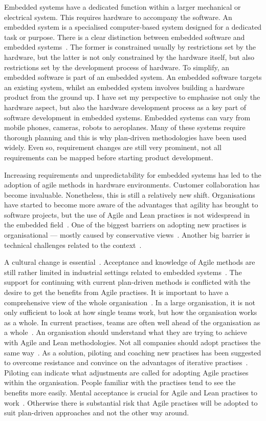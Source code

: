 \documentclass[english]{tktltiki2}
\begin{document}
Embedded systems have a dedicated function within a larger mechanical or electrical system. This requires hardware to accompany the software. An embedded system is a specialised computer-based system designed for a dedicated task or purpose. There is a clear distinction between embedded software and embedded systems~\cite{KRM13}. The former is constrained usually by restrictions set by the hardware, but the latter is not only constrained by the hardware itself, but also restrictions set by the development process of hardware. To simplify, an embedded software is part of an embedded system. An embedded software targets an existing system, whilst an embedded system involves building a hardware product from the ground up. I have set my perspective to emphasise not only the hardware aspect, but also the hardware development process as a key part of software development in embedded systems. Embedded systems can vary from mobile phones, cameras, robots to aeroplanes. Many of these systems require thorough planning and this is why plan-driven methodologies have been used widely. Even so, requirement changes are still very prominent, not all requirements can be mapped before starting product development.

Increasing requirements and unpredictability for embedded systems has led to the adoption of agile methods in hardware environments. Customer collaboration has become invaluable. Nonetheless, this is still a relatively new shift. Organisations have started to become more aware of the advantages that agility has brought to software projects, but the use of Agile and Lean practises is not widespread in the embedded field~\cite{CWR10, EB12, KRM13}. One of the biggest barriers on adopting new practises is organisational — mostly caused by conservative views~\cite{Pop02, HAB12}. Another big barrier is technical challenges related to the context~\cite{KRM13}.

A cultural change is essential~\cite{HAB12, KRM13}. Acceptance and knowledge of Agile methods are still rather limited in industrial settings related to embedded systems~\cite{HMP12}. The support for continuing with current plan-driven methods is conflicted with the desire to get the benefits from Agile practises. It is important to have a comprehensive view of the whole organisation~\cite{KRM13}. In a large organisation, it is not only sufficient to look at how single teams work, but how the organisation works as a whole. In current practises, teams are often well ahead of the organisation as a whole~\cite{HAB12}. An organisation should understand what they are trying to achieve with Agile and Lean methodologies. Not all companies should adopt practises the same way~\cite{KRM13}. As a solution, piloting and coaching new practises has been suggested to overcome resistance and convince on the advantages of iterative practises~\cite{CWR10, EB12, HMP12, KRM13}. Piloting can indicate what adjustments are called for adopting Agile practises within the organisation. People familiar with the practises tend to see the benefits more easily. Mental acceptance is crucial for Agile and Lean practises to work~\cite{HMP12}. Otherwise there is substantial risk that Agile practises will be adopted to suit plan-driven approaches and not the other way around.
\end{document}
